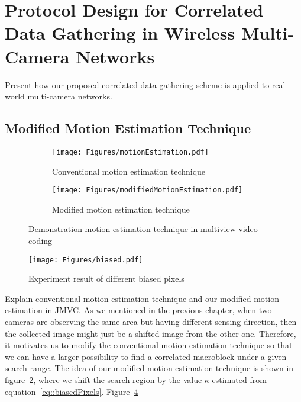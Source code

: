 \section{Protocol Design for Correlated Data Gathering in Wireless Multi-Camera Networks}
\label{sec::protocolDesign}
{\color{red} Present how our proposed correlated data gathering scheme is applied to real-world multi-camera networks.}
%
\subsection{Modified Motion Estimation Technique}
%
\begin{figure}
\begin{subfigure}[b]{\columnwidth}
\begin{center}
\texttt{[image: Figures/motionEstimation.pdf]}
\caption{\label{fig::originalME}Conventional motion estimation technique}
\end{center}
\end{subfigure}
%
\begin{subfigure}[b]{\columnwidth}
\begin{center}
\texttt{[image: Figures/modifiedMotionEstimation.pdf]}
\caption{\label{fig::modifiedME}Modified motion estimation technique}
\end{center}
\end{subfigure}
\caption{\label{fig::originalAndModifiedME}Demonstration motion estimation technique in multiview video coding}
\end{figure}
%
\begin{figure}
\begin{center}
\texttt{[image: Figures/biased.pdf]}
\caption{\label{fig::biased}Experiment result of different biased pixels}
\end{center}
\end{figure}
{\color{red} Explain conventional motion estimation technique and our modified motion estimation in JMVC.}
As we mentioned in the previous chapter, when two cameras are observing the same area but having different sensing direction, then the collected image might just be a shifted image from the other one.
Therefore, it motivates us to modify the conventional motion estimation technique so that we can have a larger possibility to find a correlated macroblock under a given search range.
The idea of our modified motion estimation technique is shown in figure~\ref{fig::modifiedME}, where we shift the search region by the value $\kappa$ estimated from equation~\eqref{eq::biasedPixels}.
Figure~\ref{fig::biased}